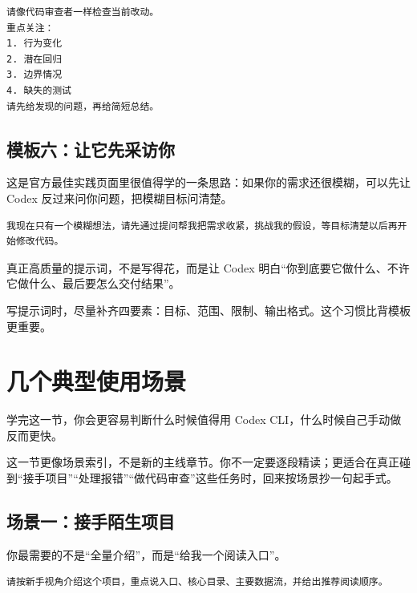 \documentclass[UTF8,a4paper,12pt]{ctexart}
\begin{document}
\begin{lstlisting}[style=prompt]
请像代码审查者一样检查当前改动。
重点关注：
1. 行为变化
2. 潜在回归
3. 边界情况
4. 缺失的测试
请先给发现的问题，再给简短总结。
\end{lstlisting}

\subsection{模板六：让它先采访你}

这是官方最佳实践页面里很值得学的一条思路：如果你的需求还很模糊，可以先让 Codex 反过来问你问题，把模糊目标问清楚。

\begin{lstlisting}[style=prompt]
我现在只有一个模糊想法，请先通过提问帮我把需求收紧，挑战我的假设，等目标清楚以后再开始修改代码。
\end{lstlisting}

\begin{tipbox}
真正高质量的提示词，不是写得花，而是让 Codex 明白“你到底要它做什么、不许它做什么、最后要怎么交付结果”。
\end{tipbox}

\begin{sumbox}
写提示词时，尽量补齐四要素：目标、范围、限制、输出格式。这个习惯比背模板更重要。
\end{sumbox}

\section{几个典型使用场景}

\begin{learnbox}
学完这一节，你会更容易判断什么时候值得用 Codex CLI，什么时候自己手动做反而更快。
\end{learnbox}

这一节更像场景索引，不是新的主线章节。你不一定要逐段精读；更适合在真正碰到“接手项目”“处理报错”“做代码审查”这些任务时，回来按场景抄一句起手式。

\subsection{场景一：接手陌生项目}

你最需要的不是“全量介绍”，而是“给我一个阅读入口”。

\begin{lstlisting}[style=prompt]
请按新手视角介绍这个项目，重点说入口、核心目录、主要数据流，并给出推荐阅读顺序。
\end{lstlisting}
\end{document}
